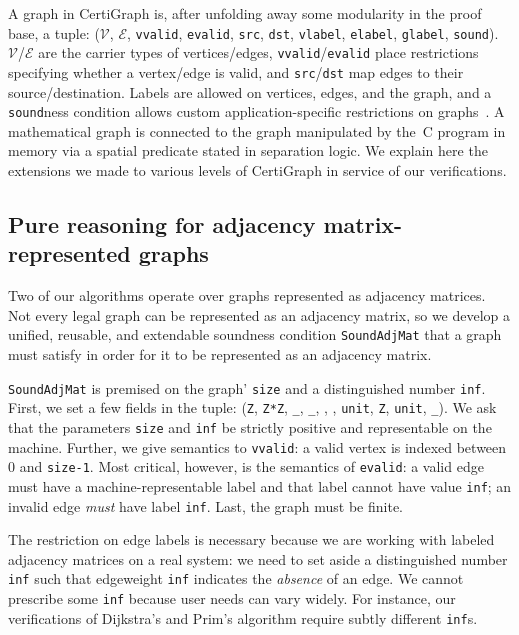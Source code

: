 
A graph in CertiGraph is, after unfolding away some modularity
in the proof base, a tuple: 
($\mathcal{V}$, $\mathcal{E}$, \texttt{vvalid}, \texttt{evalid}, 
\texttt{src}, \texttt{dst}, \texttt{vlabel}, \texttt{elabel}, \texttt{glabel}, 
\texttt{sound}). $\mathcal{V}$/$\mathcal{E}$ are the carrier 
types of vertices/edges, \texttt{vvalid}/\texttt{evalid}
place restrictions specifying whether a vertex/edge is valid, and
\texttt{src}/\texttt{dst} map edges to their source/destination.
Labels are allowed on vertices, edges, and the graph, and 
a \texttt{sound}ness condition allows custom application-specific 
restrictions on graphs~\cite{DBLP:journals/pacmpl/WangCMH19}. 
A mathematical graph is connected to the graph manipulated 
by the~C program in memory via a spatial predicate stated in separation logic.
We explain here the extensions we made to various levels of 
CertiGraph in service of our verifications.

\subsection{Pure reasoning for adjacency matrix-represented graphs}
\label{sec:adjmatpure}

Two of our algorithms operate over graphs represented as adjacency matrices.
Not every legal graph can be represented as an adjacency matrix, 
so we develop a unified, reusable, and extendable soundness condition
\texttt{SoundAdjMat} that a graph must satisfy in order for it 
to be represented as an adjacency matrix.

\texttt{SoundAdjMat} is premised on the graph' \texttt{size}
and a distinguished number \texttt{inf}.
First, we set a few
fields in the tuple: 
(\texttt{Z}, \texttt{Z*Z}, \texttt{\_}, \texttt{\_}, , , \texttt{unit}, \texttt{Z}, \texttt{unit}, \texttt{\_}).
We ask that the parameters \texttt{size} and \texttt{inf} be
strictly positive and representable on the machine. 
Further, we give semantics to \texttt{vvalid}: a valid vertex is indexed 
between $0$ and \texttt{size-1}.
Most critical, however, is the semantics of \texttt{evalid}:
a valid edge must have a machine-representable label and that label
cannot have value \texttt{inf}; an invalid edge \emph{must} have label \texttt{inf}.
Last, the graph must be finite.

The restriction on edge labels is necessary because we are working 
with labeled adjacency matrices on a real system: we need to set aside
a distinguished number \texttt{inf} such that edgeweight \texttt{inf}
indicates the \emph{absence} of an edge. We cannot
prescribe some \texttt{inf} because user needs can vary widely. For 
instance, our verifications of Dijkstra's and Prim's algorithm 
require subtly different \texttt{inf}s.

